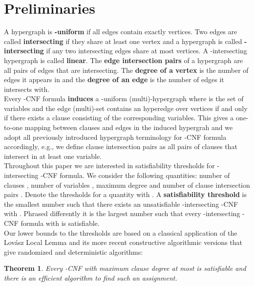 \documentclass[11pt,letterpaper]{article}
\newtheorem{theorem}{Theorem}
\begin{document}
\section{Preliminaries}

A hypergraph is {\bfseries-uniform} if all edges contain exactly  vertices. Two edges are called {\bfseries intersecting} if they share at least one vertex and a hypergraph is called {\bfseries-intersecting} if any two intersecting edges share at most  vertices. A -intersecting hypergraph is called {\bfseries linear}. The {\bfseries edge intersection pairs} of a hypergraph are all pairs of edges that are intersecting. The {\bfseries degree of a vertex} is the number of edges it appears in and the {\bfseries degree of an edge} is the number of edges it intersects with.\\

Every -CNF formula  {\bf induces} a -uniform (multi)-hypergraph  where  is the set of variables and the edge (multi)-set  contains an hyperedge over vertices  if and only if there exists a clause consisting of the corresponding variables. This gives a one-to-one mapping between clauses and edges in the induced hypergrah and we adopt all previously introduced hypergraph terminology for -CNF formula accordingly, e.g., we define clause intersection pairs as all pairs of clauses that intersect in at least one variable.\\

Throughout this paper we are interested in satisfiability thresholds for -intersecting -CNF formula. We consider the following quantities: number of clauses , number of variables , maximum degree  and number of clause intersection pairs . Denote the thresholds for a quantity  with . A {\bfseries satisfiability threshold}  is the smallest number such that there exists an unsatisfiable -intersecting -CNF with . Phrased differently it is the largest number such that every -intersecting -CNF formula with  is satisfiable.\\

Our lower bounds to the thresholds are based on a classical application of the Lov\'asz Local Lemma \cite{ErdoesLovasz} and its more recent constructive algorithmic versions that give randomized \cite{moser08} and deterministic \cite{MT-JACM,llldeterministic} algorithms:

\begin{theorem}\label{thm:lll}
Every -CNF with maximum clause degree  at most  is satisfiable and there is an efficient algorithm to find such an assignment.
\end{theorem}
\end{document}
